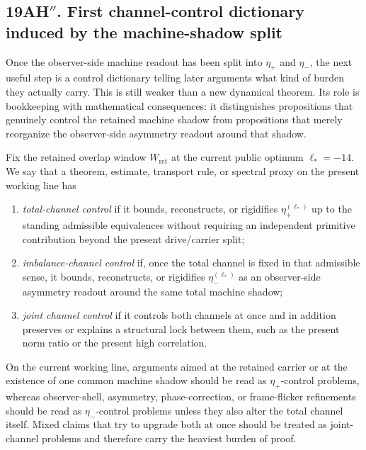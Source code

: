 \subsection*{19AH$''$. First channel-control dictionary induced by the machine-shadow split}
Once the observer-side machine readout has been split into \(\eta_+\) and \(\eta_-\), the next useful step is a control dictionary telling later arguments what kind of burden they actually carry. This is still weaker than a new dynamical theorem. Its role is bookkeeping with mathematical consequences: it distinguishes propositions that genuinely control the retained machine shadow from propositions that merely reorganize the observer-side asymmetry readout around that shadow.

\begin{definition}
Fix the retained overlap window \(W_{\mathrm{ret}}\) at the current public optimum \(\ell_*=-14\). We say that a theorem, estimate, transport rule, or spectral proxy on the present working line has
\begin{enumerate}[leftmargin=2em]
  \item \emph{total-channel control} if it bounds, reconstructs, or rigidifies \(\eta_+^{(\ell_*)}\) up to the standing admissible equivalences without requiring an independent primitive contribution beyond the present drive/carrier split;
  \item \emph{imbalance-channel control} if, once the total channel is fixed in that admissible sense, it bounds, reconstructs, or rigidifies \(\eta_-^{(\ell_*)}\) as an observer-side asymmetry readout around the same total machine shadow;
  \item \emph{joint channel control} if it controls both channels at once and in addition preserves or explains a structural lock between them, such as the present norm ratio or the present high correlation.
\end{enumerate}
\end{definition}

\begin{proposition}
On the current working line, arguments aimed at the retained carrier or at the existence of one common machine shadow should be read as \(\eta_+\)-control problems, whereas observer-shell, asymmetry, phase-correction, or frame-flicker refinements should be read as \(\eta_-\)-control problems unless they also alter the total channel itself. Mixed claims that try to upgrade both at once should be treated as joint-channel problems and therefore carry the heaviest burden of proof.
\end{proposition}

